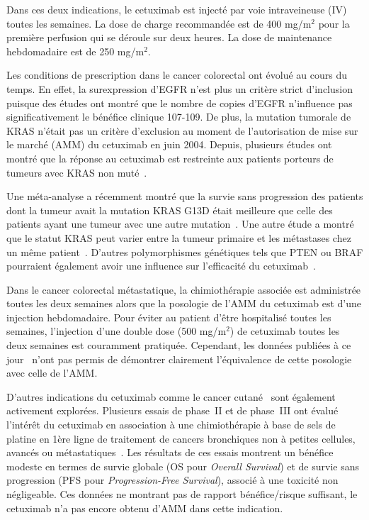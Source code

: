 Dans ces deux indications, le cetuximab est injecté par voie intraveineuse (\gls{IV}) toutes les semaines. La dose de charge recommandée est de 400 mg/m$^2$ pour la première perfusion qui se déroule sur deux heures. La dose de maintenance hebdomadaire est de 250 mg/m$^2$.

Les conditions de prescription dans le cancer colorectal ont évolué au cours du temps. En effet, la surexpression d'EGFR n'est plus un critère strict d'inclusion puisque des études ont montré que le nombre de copies d'EGFR n'influence pas significativement le bénéfice clinique 107-109. De plus, la mutation tumorale de KRAS n'était pas un critère d'exclusion au moment de l'autorisation de mise sur le marché (AMM) du cetuximab en juin 2004. Depuis, plusieurs études ont montré que la réponse au cetuximab est restreinte aux patients porteurs de tumeurs avec KRAS non muté~\citep{REF110, REF111, REF112, REF113}.

Une méta-analyse a récemment montré que la survie sans progression des patients dont la tumeur avait la mutation KRAS G13D était meilleure que celle des patients ayant une tumeur avec une autre mutation~\citep{REF114}. Une autre étude a montré que le statut KRAS peut varier entre la tumeur primaire et les métastases chez un même patient~\citep{REF115}. D'autres polymorphismes génétiques tels que PTEN ou BRAF pourraient également avoir une influence sur l'efficacité du cetuximab~\citep{REF116, REF117}.

Dans le cancer colorectal métastatique, la chimiothérapie associée est administrée toutes les deux semaines alors que la posologie de l'AMM du cetuximab est d'une injection hebdomadaire. Pour éviter au patient d'être hospitalisé toutes les semaines, l'injection d'une double dose (500 mg/m$^2$) de cetuximab toutes les deux semaines est couramment pratiquée. Cependant, les données publiées à ce jour~\citep{REF118} n'ont pas permis de démontrer clairement l'équivalence de cette posologie avec celle de l'AMM. 

D'autres indications du cetuximab comme le cancer cutané~\citep{REF119} sont également activement explorées. Plusieurs essais de phase~II et de phase~III ont évalué l'intérêt du cetuximab en association à une chimiothérapie à base de sels de platine en 1ère ligne de traitement de cancers bronchiques non à petites cellules, avancés ou métastatiques~\citep{REF120, REF121}. Les résultats de ces essais montrent un bénéfice modeste en termes de survie globale (OS pour \textit{Overall Survival}) et de survie sans progression (PFS pour \textit{Progression-Free Survival}), associé à une toxicité non négligeable. Ces données ne montrant pas de rapport bénéfice/risque suffisant, le cetuximab n'a pas encore obtenu d'AMM dans cette indication.

